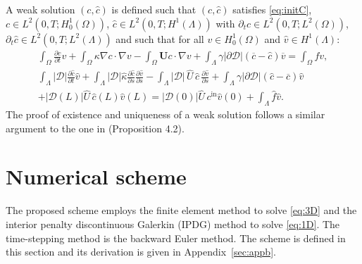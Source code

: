 \documentclass[pdflatex,sn-mathphys-num]{sn-jnl}%
\newcommand{\bfU}{{\boldsymbol U}}
\theoremstyle{thmstyleone}%
\theoremstyle{thmstyletwo}%
\theoremstyle{thmstylethree}%
\begin{document}



A weak solution $(c,\hat c)$ is defined such that
$(c,\hat c)$ satisfies \eqref{eq:initC}, 
$c\in L^2(0,T;H_0^1(\Omega))$, $\hat c \in L^2(0,T;H^1(\Lambda))$ with $\partial_t c \in L^2(0,T;L^2(\Omega))$, $\partial_t \hat c \in L^2(0,T;L^2(\Lambda))$ and such that  for all $v\in H_0^1(\Omega)$ and $\hat v \in H^1(\Lambda)$:
\begin{align*}
    \int_\Omega\frac{\partial c}{\partial t}  v
      +   \int_\Omega  \kappa \nabla c \cdot \nabla v 
      - \int_\Omega \bfU c \cdot \nabla v
      +\int_\Lambda\gamma \vert \partial\mathcal{D}\vert \left(\overline{c}-\hat{c}\right)\overline{v}
        = \int_\Omega f v,\\
    \int_\Lambda |\mathcal{D}| \frac{\partial \hat c}{\partial t} \hat v
    + \int_\Lambda \vert \mathcal{D}\vert \hat \kappa \frac{\partial \hat c}{\partial s} \frac{\partial \hat v}{\partial s} 
    -\int_{\Lambda} |\mathcal D|\,\hat U\,\hat c \,\frac{\partial \hat v}{\partial s}
    +\int_\Lambda \gamma|\partial\mathcal{D}|\left(\hat c-\overline{c}\right)   \hat v \nonumber\\
    + |\mathcal{D}(L)|\hat U \, \hat c(L) \hat v(L)
   =     |\mathcal{D}(0)|\hat U \, c^{\text{in}} \hat v(0) + \int_\Lambda \hat f \hat v.
\end{align*}
The proof of existence and uniqueness of a weak solution follows a similar argument to the one in \cite{masri2024modelling} (Proposition 4.2).









\section{Numerical scheme}
\label{sec:formulation}
\noindent The proposed scheme employs the finite element method to solve \eqref{eq:3D} and the interior penalty discontinuous Galerkin (IPDG) method to solve \eqref{eq:1D}. The time-stepping method is the backward Euler method.
The scheme is defined in this section and its derivation is given in Appendix~\ref{sec:appb}.
\end{document}
